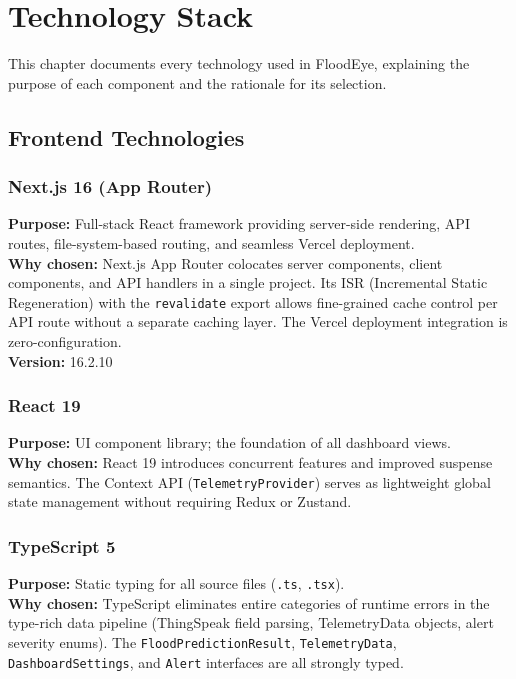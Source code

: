 ﻿%
\chapter{Technology Stack}

This chapter documents every technology used in FloodEye, explaining the purpose of each component and the rationale for its selection.

\section{Frontend Technologies}

\subsection{Next.js 16 (App Router)}
\textbf{Purpose:} Full-stack React framework providing server-side rendering, API routes, file-system-based routing, and seamless Vercel deployment.\\
\textbf{Why chosen:} Next.js App Router colocates server components, client components, and API handlers in a single project. Its ISR (Incremental Static Regeneration) with the \texttt{revalidate} export allows fine-grained cache control per API route without a separate caching layer. The Vercel deployment integration is zero-configuration.\\
\textbf{Version:} 16.2.10

\subsection{React 19}
\textbf{Purpose:} UI component library; the foundation of all dashboard views.\\
\textbf{Why chosen:} React 19 introduces concurrent features and improved suspense semantics. The Context API (\texttt{TelemetryProvider}) serves as lightweight global state management without requiring Redux or Zustand.

\subsection{TypeScript 5}
\textbf{Purpose:} Static typing for all source files (\texttt{.\allowbreak{}ts}, \texttt{.\allowbreak{}tsx}).\\
\textbf{Why chosen:} TypeScript eliminates entire categories of runtime errors in the type-rich data pipeline (ThingSpeak field parsing, TelemetryData objects, alert severity enums). The \texttt{FloodPredictionResult}, \texttt{TelemetryData}, \texttt{DashboardSettings}, and \texttt{Alert} interfaces are all strongly typed.

